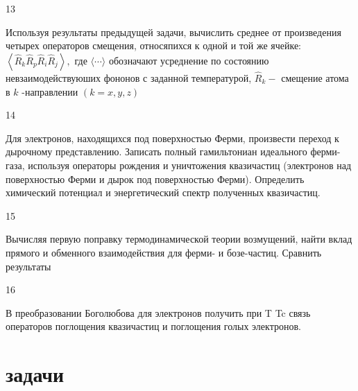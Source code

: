 \documentclass[a4paper,12pt]{article} %
\begin{document}
\begin{task}

13

Используя результаты предыдущей задачи, вычислить среднее от произведения четырех операторов смещения, относяпихся к одной и той же ячейке: $\left\langle\hat{R}_{k} \hat{R}_{p} \hat{R}_{i} \hat{R}_{j}\right\rangle,$ где $\langle\cdots\rangle$ обозначают усреднение по состоянию невзаимодействуюших фононов с заданной температурой, $\hat{R}_{k}-$ смещение атома в $k$ -направлении $(k=x, y, z)$



\end{task}


\begin{task}

14

Для электронов, находящихся под поверхностью Ферми, произвести переход к дырочному представлению. Записать полный гамильтониан идеального ферми-газа, используя операторы рождения и уничтожения квазичастиц (электронов над поверхностью Ферми и дырок под поверхностью Ферми). Определить химический потенциал и энергетический спектр полученных квазичастиц. 



\end{task}


\begin{task}

15

Вычисляя первую поправку термодинамической теории возмущений, найти вклад прямого и обменного взаимодействия для ферми- и бозе-частиц. Сравнить результаты


\end{task}


\begin{task}

16

В преобразовании Боголюбова для электронов получить при T  Tc связь операторов поглощения квазичастиц и поглощения голых электронов.


\end{task}







\clearpage
\part{задачи}
\end{document}
